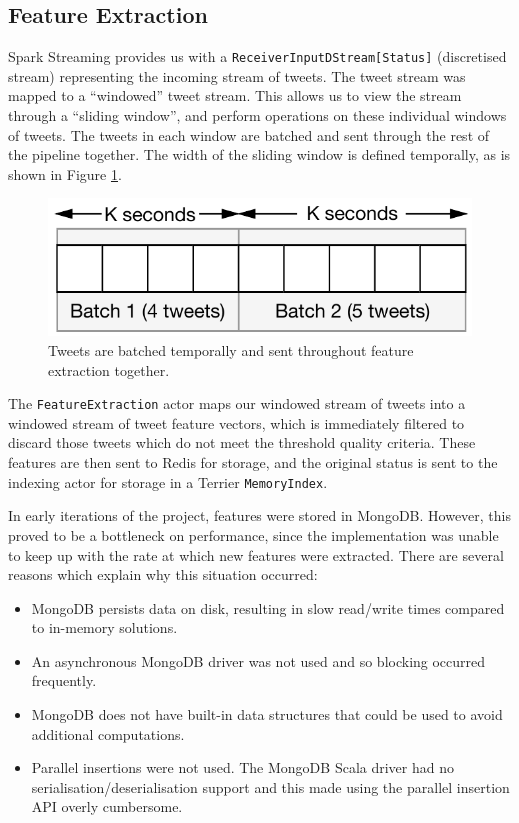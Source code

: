 \documentclass{l4proj}
\newcommand{\code}[1]{\texttt{#1}}
\begin{document}
    
    
    \subsection{Feature Extraction}
        
        Spark Streaming provides us with a \code{ReceiverInputDStream[Status]} (discretised stream) representing the incoming stream of tweets. The tweet stream was mapped to a ``windowed'' tweet stream. This allows us to view the stream through a ``sliding window'', and perform operations on these individual windows of tweets. The tweets in each window are batched and sent through the rest of the pipeline together. The width of the sliding window is defined temporally, as is shown in Figure \ref{slidingwindow}.
        
\begin{figure}
\centering
\includegraphics[scale=0.8]{slidingwindow.pdf}
\caption{Tweets are batched temporally and sent throughout feature extraction together.}
\label{slidingwindow}
\end{figure}

        The \code{FeatureExtraction} actor maps our windowed stream of tweets into a windowed stream of tweet feature vectors, which is immediately filtered to discard those tweets which do not meet the threshold quality criteria. These features are then sent to Redis for storage, and the original status is sent to the indexing actor for storage in a Terrier \code{MemoryIndex}.
        
        In early iterations of the project, features were stored in MongoDB. However, this proved to be a bottleneck on performance, since the implementation was unable to keep up with the rate at which new features were extracted. There are several reasons which explain why this situation occurred:
        
        \begin{itemize}
        \item MongoDB persists data on disk, resulting in slow read/write times compared to in-memory solutions.
        \item An asynchronous MongoDB driver was not used and so blocking occurred frequently.
        \item MongoDB does not have built-in data structures that could be used to avoid additional computations.
        \item Parallel insertions were not used. The MongoDB Scala driver had no serialisation/deserialisation support and this made using the parallel insertion API overly cumbersome.
        \end{itemize}
        
\end{document}
